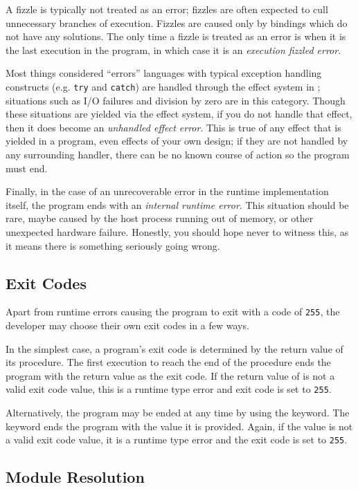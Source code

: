 A fizzle is typically not treated as an error; fizzles are often expected
to cull unnecessary branches of execution. Fizzles are caused only by bindings
which do not have any solutions. The only time a fizzle is treated as an error
is when it is the last execution in the program, in which case it is an \emph{execution
fizzled error}.

Most things considered ``errors'' languages with typical exception
handling constructs (e.g. \texttt{try} and \texttt{catch}) are handled through
the effect system in \Trilogy{}; situations such as I/O failures and division by
zero are in this category. Though these situations are yielded via the effect
system, if you do not handle that effect, then it does become an
\emph{unhandled effect error}. This is true of any effect that is yielded in
a program, even effects of your own design; if they are not handled by any
surrounding handler, there can be no known course of action so the program
must end.

Finally, in the case of an unrecoverable error in the runtime implementation
itself, the program ends with an \emph{internal runtime error}. This situation
should be rare, maybe caused by the host process running out of memory, or
other unexpected hardware failure. Honestly, you should hope never to witness
this, as it means there is something seriously going wrong.

\subsection{Exit Codes}
\label{sec:exitcode}

Apart from runtime errors causing the program to exit with a code of \texttt{255},
the developer may choose their own exit codes in a few ways.

In the simplest case, a \Trilogy{} program's exit code is determined by the
return value of its  procedure. The first execution to reach the end
of the  procedure ends the program with the return value as the exit
code. If the return value of  is not a valid exit code value, this
is a runtime type error and exit code is set to \texttt{255}.

Alternatively, the program may be ended at any time by using the  keyword.
The  keyword ends the program with the value it is provided. Again, if
the value is not a valid exit code value, it is a runtime type error and the exit code
is set to \texttt{255}.

\subsection{Module Resolution}
\label{sec:module-resolution}

